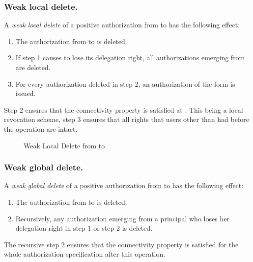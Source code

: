 \documentclass[runningheads]{llncs}
\begin{document}
\subsubsection{Weak local delete.}
A \emph{weak local delete} of a positive authorization from  to  has the following effect:
\vspace{-1mm}
\begin{enumerate}
 \item The authorization from  to  is deleted.
 \item If step 1 causes  to lose its delegation right, all authorizations emerging from  are deleted.
 \item For every authorization  deleted in step 2, an authorization of the form  is issued.
\end{enumerate}
\vspace{-1mm}
Step 2 ensures that the connectivity property is satisfied at . This being a local revocation scheme, step 3 ensures that all rights that users other than  had before the operation are intact.

\vspace{-3mm}
\begin{figure}[H]
\center
{}
\vspace{-1mm}
\caption{Weak Local Delete from  to }
\end{figure}
\vspace{-7mm}


\subsubsection{Weak global delete.}
A \emph{weak global delete} of a positive authorization from  to  has the following effect:
\begin{enumerate}
 \item The authorization from  to  is deleted.
 \item Recursively, any authorization emerging from a principal who loses her delegation right in step 1 or step 2 is deleted.
\end{enumerate}
The recursive step 2 ensures that the connectivity property is satisfied for the whole authorization specification after this operation.
\end{document}
